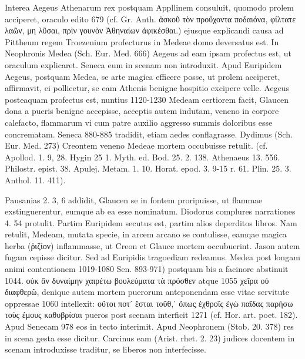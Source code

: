 \documentclass[a4paper, 11pt, oneside, polutonikogreek, german]{article}
\begin{document}
Interea Aegeus Athenarum rex postquam Appllinem consuluit, quomodo prolem acciperet, oraculo edito 679 (cf. Gr. Anth. ἀσκοῦ τὸν προὔχοντα ποδαιόνα, φίλτατε λαῶν, μη λῦσαι, πρὶν γουνὸν Ἀθηναίων ἀφικέσθαι.) ejusque explicandi causa ad Pittheum regem Troezenium profecturus in Medeae domo deversatus est. In Neophronis Medea (Sch. Eur. Med. 666) Aegeus ad eam ipsam profectus est, ut oraculum explicaret. Seneca eum in scenam non introduxit. Apud Euripidem Aegeus, postquam Medea, se arte magica efficere posse, ut prolem acciperet, affirmavit, ei pollicetur, se eam Athenis benigne hospitio excipere velle. Aegeus posteaquam profectus est, nuntius 1120-1230 Medeam certiorem facit, Glaucen dona a pueris benigne accepisse, acceptis autem indutam, veneno in corpore calefacto, flammarum vi cum patre auxilio aggresso summis doloribus esse concrematam. Seneca 880-885 tradidit, etiam aedes conflagrasse. Dydimus (Sch. Eur. Med. 273) Creontem veneno Medeae mortem occubuisse retulit. (cf. Apollod. 1. 9, 28. Hygin 25 1. Myth. ed. Bod. 25. 2. 138. Athenaeus 13. 556. Philostr. epist. 38. Apulej. Metam. 1. 10. Horat. epod. 3. 9-15 r. 61. Plin. 25. 3. Anthol. 11. 411).

Pausanias 2. 3, 6 addidit, Glaucen se in fontem proripuisse, ut flammae exstinguerentur, eumque ab ea esse nominatum. Diodorus complures narrationes 4. 54 protulit. Partim Euripidem secutus est, partim alios deperditos libros. Nam retulit, Medeam, mutata specie, in arcem arcano se contulisse, eamqae magica herba (ῥιζίον) inflammasse, ut Creon et Glauce mortem occubuerint. Jason autem fugam cepisse dicitur. Sed ad Euripidis tragoediam redeamus. Medea post longam animi contentionem 1019-1080 Sen. 893-971) postquam bis a facinore abstinuit 1044. οὐκ ἂν δυναίμην χαιρέτω βουλεύματα τὰ πρόσθεν atque 1055 χεῖρα οὐ διαφθερῶ, denique autem mortem puerorum anteponendam esse vitae servitute oppressae 1060 intellexit: οὔτοι ποτ᾽ ἔσται τοῦθ,᾽ ὅπως ἐχθροῖς ἐγὼ παῖδας παρήσω τοὺς ἐμους καθυβρίσαι pueros post scenam interficit 1271 (cf. Hor. art. poet. 182). Apud Senecam 978 eos in tecto interimit. Apud Neophronem (Stob. 20. 378) res in scena gesta esse dicitur. Carcinus eam (Arist. rhet. 2. 23) judices docentem in scenam introduxisse traditur, se liberos non interfecisse.
\end{document}
